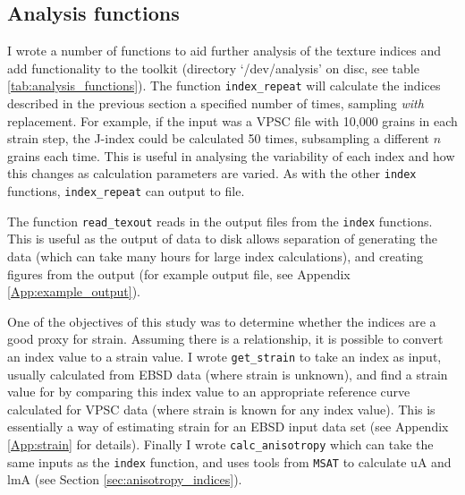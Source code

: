 \documentclass[a4paper,12pt,twoside]{report}
\numberwithin{equation}{chapter}
\begin{document}
\subsection{Analysis functions}

I wrote a number of functions to aid further analysis of the texture indices and add functionality to the toolkit (directory \lq{}/dev/analysis\rq{} on disc, see table \ref{tab:analysis_functions}). The function \texttt{index\_{}repeat} will calculate the indices described in the previous section a specified number of times, sampling \emph{with} replacement. For example, if the input was a VPSC file with 10,000 grains in each strain step, the J-index could be calculated 50 times, subsampling a different $n$ grains each time. This is useful in analysing the variability of each index and how this changes as calculation parameters are varied.  As with the other \texttt{index} functions, \texttt{index\_{}repeat} can output to file.

The function \texttt{read\_{}texout} reads in the output files from the \texttt{index} functions. This is useful as the output of data to disk allows separation of generating the data (which can take many hours for large index calculations), and creating figures from the output (for example output file, see Appendix \ref{App:example_output}).

One of the objectives of this study was to determine whether the indices are a good proxy for strain. Assuming there is a relationship, it is possible to convert an index value to a strain value. I wrote \texttt{get\_{}strain} to take an index as input, usually calculated from EBSD data (where strain is unknown), and find a strain value for by comparing this index value to an appropriate reference curve calculated for VPSC data (where strain is known for any index value). This is essentially a way of estimating strain for an EBSD input data set (see Appendix \ref{App:strain} for details). Finally I wrote \texttt{calc\_{}anisotropy} which can take the same inputs as the \texttt{index} function, and uses tools from \texttt{MSAT} to calculate uA and lmA (see Section \ref{sec:anisotropy_indices}).
\end{document}

